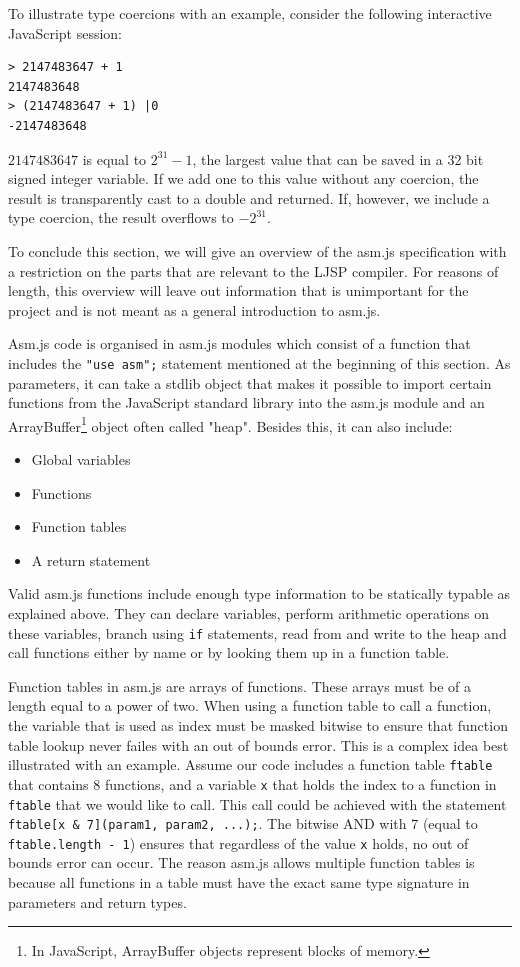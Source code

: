 \documentclass[11pt]{report}
\begin{document}
To illustrate type coercions with an example, consider the following interactive JavaScript session:

\begin{lstlisting}
> 2147483647 + 1
2147483648
> (2147483647 + 1) |0
-2147483648
\end{lstlisting}

$2147483647$ is equal to $2^{31}-1$, the largest value that can be saved in a 32 bit signed integer variable. If we add one to this value without any coercion, the result is transparently cast to a double and returned. If, however, we include a type coercion, the result overflows to $-2^{31}$.

To conclude this section, we will give an overview of the asm.js specification with a restriction on the parts that are relevant to the LJSP compiler. For reasons of length, this overview will leave out information that is unimportant for the project and is not meant as a general introduction to asm.js.

Asm.js code is organised in asm.js modules which consist of a function that includes the \texttt{"use asm";} statement mentioned at the beginning of this section. As parameters, it can take a stdlib object that makes it possible to import certain functions from the JavaScript standard library into the asm.js module and an ArrayBuffer\footnote{In JavaScript, ArrayBuffer objects represent blocks of memory.} object often called "heap". Besides this, it can also include:
\begin{itemize}
\item Global variables
\item Functions
\item Function tables
\item A return statement
\end{itemize}

Valid asm.js functions include enough type information to be statically typable as explained above. They can declare variables, perform arithmetic operations on these variables, branch using \texttt{if} statements, read from and write to the heap and call functions either by name or by looking them up in a function table.

Function tables in asm.js are arrays of functions. These arrays must be of a length equal to a power of two. When using a function table to call a function, the variable that is used as index must be masked bitwise to ensure that function table lookup never failes with an out of bounds error. This is a complex idea best illustrated with an example. Assume our code includes a function table \texttt{ftable} that contains $8$ functions, and a variable \texttt{x} that holds the index to a function in \texttt{ftable} that we would like to call. This call could be achieved with the statement \texttt{ftable[x \& 7](param1, param2, ...);}. The bitwise AND with $7$ (equal to \texttt{ftable.length - 1}) ensures that regardless of the value \texttt{x} holds, no out of bounds error can occur. The reason asm.js allows multiple function tables is because all functions in a table must have the exact same type signature in parameters and return types.
\end{document}
